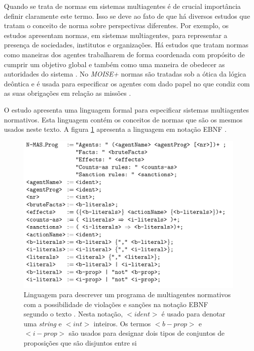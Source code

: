 Quando se trata de normas em sistemas multiagentes é de crucial importância definir claramente este termo. Isso se deve ao fato de que há diversos estudos que tratam o conceito de norma sobre perspectivas diferentes. Por exemplo, os estudos \cite{formalizeagent} \cite{formalizeagent2} apresentam normas, em sistemas multiagentes, para representar a presença de sociedades, institutos e organizações. Há estudos que tratam normas como maneiras dos agentes trabalharem de forma coordenada com propósito de cumprir um objetivo global e também como uma maneira de obedecer as autoridades do sistema \cite{modelingnormsforautnomousagent} \cite{amodelmultiagentsystemdynamicrelationship}. No \textit{MOISE+} normas são tratadas sob a ótica da lógica deôntica e é usada para especificar os agentes com dado papel no que condiz com as suas obrigações em relação as missões \cite{moiseframework} \cite{moiseframeworktwo}.

O estudo \cite{dastaniframework} apresenta uma linguagem formal para especificar sistemas multiagentes normativos. Esta linguagem contém os conceitos de normas que são os mesmos usados neste texto. A figura \ref{descreveprograma} apresenta a linguagem em notação EBNF \cite{dastaniframework}.

\begin{figure}[H]
  \centering
  \includegraphics[width=0.8\linewidth]{figure/masprogram.png} 
  \caption{Linguagem para descrever um programa de multiagentes normativos com a possibilidade de violações e sanções na notação EBNF segundo o texto \cite{dastaniframework}. Nesta notação, $<ident>$ é usado para denotar uma \textit{string} e $<int>$ inteiros. Os termos $<b-prop>$ e $<i-prop>$ são usados para designar dois tipos de conjuntos de proposições que são disjuntos entre si}
  \label{descreveprograma}
\end{figure}

